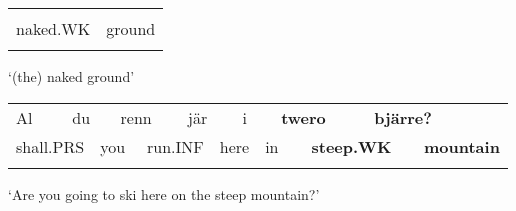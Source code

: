 \begin{listWWNumlxxiileveli}
\item 

\end{listWWNumlxxiileveli}

\begin{tabular}{ll}
\lsptoprule
\multicolumn{2}{l}{bero

}\\
naked.WK & ground\\
\lspbottomrule
\end{tabular}

\begin{styleTranslation}
‘(the) naked ground’

\end{styleTranslation}

\begin{tabular}{llllllllllllll}
\lsptoprule
Al & \multicolumn{2}{l}{du

} & \multicolumn{2}{l}{renn

} & \multicolumn{2}{l}{jär

} & \multicolumn{2}{l}{i

} & \multicolumn{2}{l}{{\bfseries twero}

} & \multicolumn{2}{l}{{\bfseries bjärre?}

} & \\
\multicolumn{2}{l}{shall.PRS

} & \multicolumn{2}{l}{you

} & \multicolumn{2}{l}{run.INF

} & \multicolumn{2}{l}{here

} & \multicolumn{2}{l}{in

} & \multicolumn{2}{l}{{\bfseries steep.WK}

} & \multicolumn{2}{l}{{\bfseries mountain}

}\\
\lspbottomrule
\end{tabular}

\begin{styleTranslation}
‘Are you going to ski here on the steep mountain?’

\end{styleTranslation}

